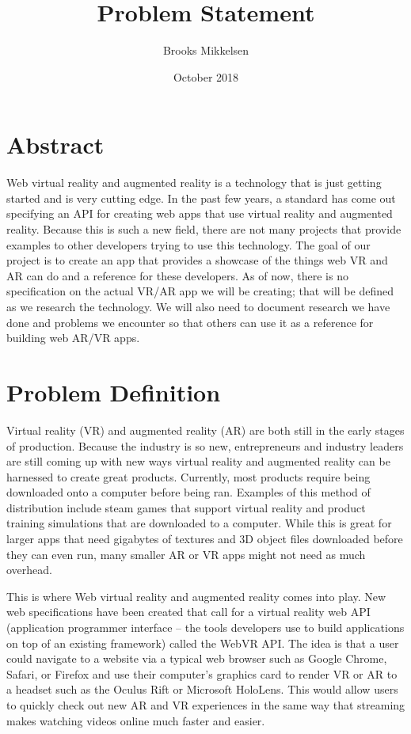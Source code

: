 \documentclass[10pt,peerreview]{IEEEtran}
\title{Problem Statement}
\author{Brooks Mikkelsen}
\date{October 2018}
\begin{document}
\maketitle

\section{Abstract}
Web virtual reality and augmented reality is a technology that is just getting started and is very cutting edge. In the past few years, a standard has come out specifying an API for creating web apps that use virtual reality and augmented reality. Because this is such a new field, there are not many projects that provide examples to other developers trying to use this technology. The goal of our project is to create an app that provides a showcase of the things web VR and AR can do and a reference for these developers. As of now, there is no specification on the actual VR/AR app we will be creating; that will be defined as we research the technology. We will also need to document research we have done and problems we encounter so that others can use it as a reference for building web AR/VR apps. 

\section{Problem Definition}
Virtual reality (VR) and augmented reality (AR) are both still in the early stages of production. Because the industry is so new, entrepreneurs and industry leaders are still coming up with new ways virtual reality and augmented reality can be harnessed to create great products. Currently, most products require being downloaded onto a computer before being ran. Examples of this method of distribution include steam games that support virtual reality and product training simulations that are downloaded to a computer. While this is great for larger apps that need gigabytes of textures and 3D object files downloaded before they can even run, many smaller AR or VR apps might not need as much overhead. 

This is where Web virtual reality and augmented reality comes into play. New web specifications have been created that call for a virtual reality web API (application programmer interface – the tools developers use to build applications on top of an existing framework) called the WebVR API. The idea is that a user could navigate to a website via a typical web browser such as Google Chrome, Safari, or Firefox and use their computer’s graphics card to render VR or AR to a headset such as the Oculus Rift or Microsoft HoloLens. This would allow users to quickly check out new AR and VR experiences in the same way that streaming makes watching videos online much faster and easier. 
\end{document}
